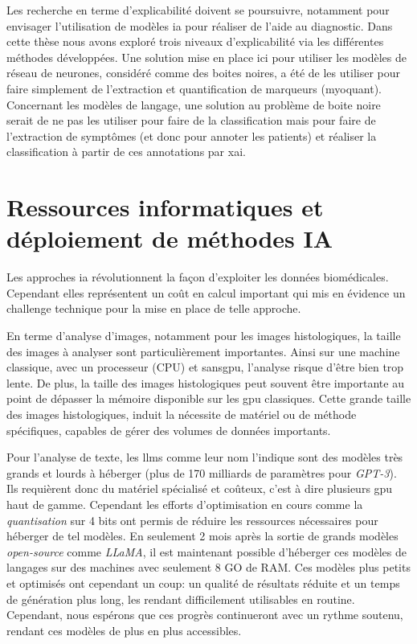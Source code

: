 Les recherche en terme d'explicabilité doivent se poursuivre, notamment pour envisager l'utilisation de modèles \gls{ia} pour réaliser de l'aide au diagnostic. Dans cette thèse nous avons exploré trois niveaux d'explicabilité via les différentes méthodes développées. Une solution mise en place ici pour utiliser les modèles de réseau de neurones, considéré comme des boites noires, a été de les utiliser pour faire simplement de l'extraction et quantification de marqueurs (\gls{myoquant}). Concernant les modèles de langage, une solution au problème de boite noire serait de ne pas les utiliser pour faire de la classification mais pour faire de l'extraction de symptômes (et donc pour annoter les patients) et réaliser la classification à partir de ces annotations par \gls{xai}.

\section{Ressources informatiques et déploiement de méthodes IA}
Les approches \gls{ia} révolutionnent la façon d'exploiter les données biomédicales. Cependant elles représentent un coût en calcul important qui mis en évidence un challenge technique pour la mise en place de telle approche.

En terme d'analyse d'images, notamment pour les images histologiques, la taille des images à analyser sont particulièrement importantes. Ainsi sur une machine classique, avec un processeur (CPU) et sans\gls{gpu}, l'analyse risque d'être bien trop lente.  De plus, la taille des images histologiques peut souvent être importante au point de dépasser la mémoire disponible sur les \gls{gpu} classiques. Cette grande taille des images histologiques, induit la nécessite de matériel ou de méthode spécifiques, capables de gérer des volumes de données importants.

Pour l'analyse de texte, les \gls{llms} comme leur nom l'indique sont des modèles très grands et lourds à héberger (plus de 170 milliards de paramètres pour \textit{GPT-3}). Ils requièrent donc du matériel spécialisé et coûteux, c'est à dire plusieurs \gls{gpu} haut de gamme. Cependant les efforts d'optimisation en cours comme la \textit{quantisation} sur 4 bits ont permis de réduire les ressources nécessaires pour héberger de tel modèles. En seulement 2 mois après la sortie de grands modèles \textit{open-source} comme \textit{LLaMA}, il est maintenant possible d'héberger ces modèles de langages sur des machines avec seulement 8 GO de RAM. Ces modèles plus petits et optimisés ont cependant un coup: un qualité de résultats réduite et un temps de génération plus long, les rendant difficilement utilisables en routine. Cependant, nous espérons que ces progrès continueront avec un rythme soutenu, rendant ces modèles de plus en plus accessibles.

